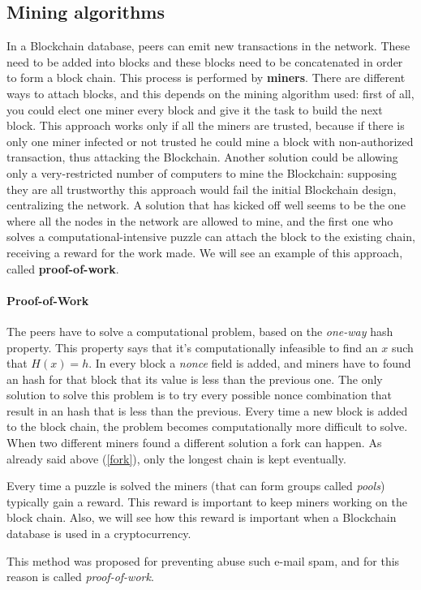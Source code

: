 \subsection{Mining algorithms}
In a Blockchain database, peers can emit new transactions in the network. These
need to be added into blocks and these blocks need to be concatenated in order
to form a block chain. This process is performed by \textbf{miners}.
There are different ways to attach blocks, and this depends on the mining
algorithm used: first of all, you could elect one miner every block and give
it the task to build the next block. This approach works only if all the miners
are trusted, because if there is only one miner infected or not trusted he
could mine a block with non-authorized transaction, thus attacking the
Blockchain. Another solution could be allowing only a very-restricted number of
computers to mine the Blockchain: supposing they are all trustworthy this
approach would fail the initial Blockchain design, centralizing the
network.
A solution that has kicked off well seems to be the one where all the nodes in
the network are allowed to mine, and the first one who solves a
computational-intensive puzzle can attach the block to the existing chain,
receiving a reward for the work made. We will see an example of this approach,
called \textbf{proof-of-work}.


\paragraph{Proof-of-Work}

The peers have to solve a computational problem, based on the \textit{one-way}
hash property. This property says that it's computationally infeasible to find
an $x$ such that $H(x) = h$.
In every block a \textit{nonce} field is added, and miners have to found an
hash for that block that its value is less than the previous one\cite{sok15}.
The only solution to solve this problem is to try every possible nonce
combination that result in an hash that is less than the previous. Every time a
new block is added to the block chain, the problem becomes computationally more
difficult to solve.
When two different miners found a different solution a fork can happen. As
already said above (\ref{fork}), only the longest chain is kept eventually.

Every time a puzzle is solved the miners (that can form groups called
\textit{pools}) typically gain a reward. This reward is important to keep miners
working on the block chain. Also, we will see how this reward is important when
a Blockchain database is used in a cryptocurrency.

This method was proposed for preventing abuse such e-mail spam, and for this
reason is called \textit{proof-of-work}\cite{back02}.
